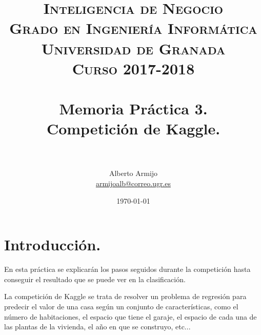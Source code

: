 

\title{	
	\normalfont \normalsize 
	\textsc{\textbf{Inteligencia de Negocio} \\ Grado en Ingeniería Informática \\ Universidad de Granada \\
	Curso 2017-2018} \\ [25pt] %
	\horrule{0.5pt} \\[0.4cm] %
	\huge Memoria Práctica 3. \\
	\huge Competición de Kaggle.
	\\ %
	\horrule{2pt} \\[0.5cm] %
}

\author{Alberto Armijo  \\
\href{mailto:armijoalb@correo.ugr.es}{armijoalb@correo.ugr.es}} %
\date{\normalsize\today} %



	
	\maketitle %
	
	\newpage %
	
	\tableofcontents %
	
	\listoffigures %
	
	\listoftables %
	
	\newpage
	
	\section[Introducción]{Introducción.}
	En esta práctica se explicarán los pasos seguidos durante la competición hasta conseguir el resultado que se puede ver en la clasificación.
	
	\vspace{0.06in}
	La competición de Kaggle se trata de resolver un problema de regresión para predecir el valor de una casa según un conjunto de características, como el número de habitaciones, el espacio que tiene el garaje, el espacio de cada una de las plantas de la vivienda, el año en que se construyo, etc...
	
